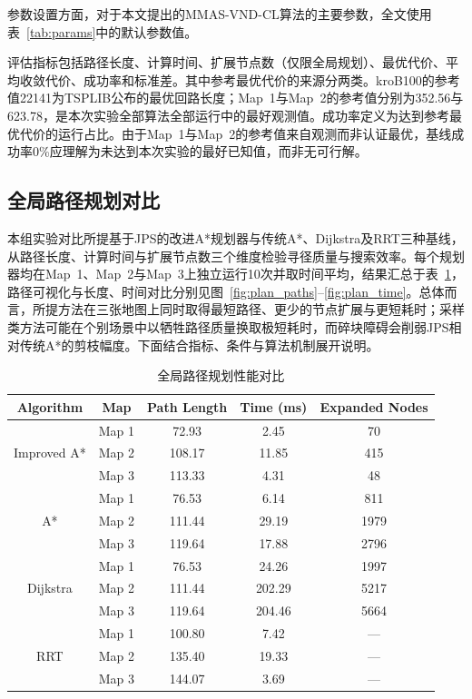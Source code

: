 \documentclass[lettersize,journal]{IEEEtran}
\begin{document}
参数设置方面，对于本文提出的MMAS-VND-CL算法的主要参数，全文使用表~\textcolor{blue}{\ref{tab:params}}中的默认参数值。

评估指标包括路径长度、计算时间、扩展节点数（仅限全局规划）、最优代价、平均收敛代价、成功率和标准差。其中参考最优代价的来源分两类。kroB100的参考值22141为TSPLIB公布的最优回路长度；Map~1与Map~2的参考值分别为352.56与623.78，是本次实验全部算法全部运行中的最好观测值。成功率定义为达到参考最优代价的运行占比。由于Map~1与Map~2的参考值来自观测而非认证最优，基线成功率0\%应理解为未达到本次实验的最好已知值，而非无可行解。
\subsection{全局路径规划对比}
\label{subsec:exp_plan}
本组实验对比所提基于JPS的改进A*规划器与传统A*、Dijkstra及RRT三种基线，从路径长度、计算时间与扩展节点数三个维度检验寻径质量与搜索效率。每个规划器均在Map~1、Map~2与Map~3上独立运行10次并取时间平均，结果汇总于表~\textcolor{blue}{\ref{tab:plan}}，路径可视化与长度、时间对比分别见图~\textcolor{blue}{\ref{fig:plan_paths}}--\textcolor{blue}{\ref{fig:plan_time}}。总体而言，所提方法在三张地图上同时取得最短路径、更少的节点扩展与更短耗时；采样类方法可能在个别场景中以牺牲路径质量换取极短耗时，而碎块障碍会削弱JPS相对传统A*的剪枝幅度。下面结合指标、条件与算法机制展开说明。

\begin{table}[!ht]
\caption{全局路径规划性能对比}
\label{tab:plan}
\centering
\footnotesize
\setlength{\tabcolsep}{4pt}
\begin{tabular}{ccccc}
\toprule
Algorithm & Map & Path Length & Time (ms) & Expanded Nodes \\
\midrule
\multirow{3}{*}{Improved A*}
& Map 1 & 72.93 & 2.45 & 70 \\
& Map 2 & 108.17 & 11.85 & 415 \\
& Map 3 & 113.33 & 4.31 & 48 \\
\midrule
\multirow{3}{*}{A*}
& Map 1 & 76.53 & 6.14 & 811 \\
& Map 2 & 111.44 & 29.19 & 1979 \\
& Map 3 & 119.64 & 17.88 & 2796 \\
\midrule
\multirow{3}{*}{Dijkstra}
& Map 1 & 76.53 & 24.26 & 1997 \\
& Map 2 & 111.44 & 202.29 & 5217 \\
& Map 3 & 119.64 & 204.46 & 5664 \\
\midrule
\multirow{3}{*}{RRT}
& Map 1 & 100.80 & 7.42 & --- \\
& Map 2 & 135.40 & 19.33 & --- \\
& Map 3 & 144.07 & 3.69 & --- \\
\bottomrule
\end{tabular}
\end{table}
\end{document}
